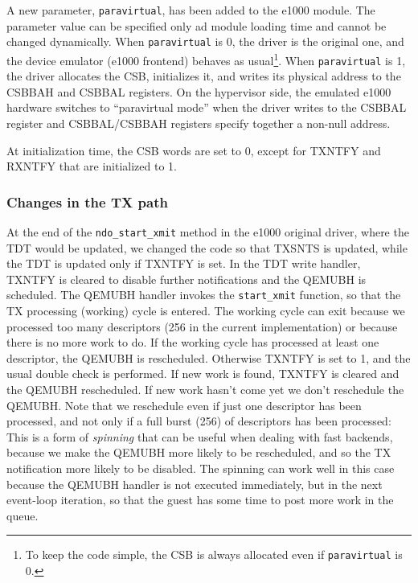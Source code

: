 \vspace{0.5cm}

A new parameter, \texttt{paravirtual}, has been added to the e1000 module. The parameter value can be specified only ad module loading time
and cannot be changed dynamically. When \texttt{paravirtual} is 0, the driver is the original one, and the device emulator (e1000 frontend)
behaves as usual\footnote{To keep the code simple, the CSB is always allocated even if \texttt{paravirtual} is 0.}. When 
\texttt{paravirtual} is 1, the driver allocates the CSB, initializes it, and writes its physical address to the CSBBAH and CSBBAL registers.
On the hypervisor side, the emulated e1000 hardware switches to ``paravirtual mode'' when the driver writes to the CSBBAL register and
CSBBAL/CSBBAH registers specify together a non-null address.

\vspace{0.5cm}

At initialization time, the CSB words are set to 0, except for TXNTFY and RXNTFY that are initialized to 1.


\subsubsection{Changes in the TX path}
At the end of the \texttt{ndo\_start\_xmit} method in the e1000 original driver, where the TDT would be updated, we changed the
code so that TXSNTS is updated, while the TDT is updated only if TXNTFY is set.
In the TDT write handler, TXNTFY is cleared to disable further notifications and the QEMUBH is scheduled. The QEMUBH handler invokes the
\texttt{start\_xmit} function, so that the TX processing (working) cycle is entered. The working cycle can exit because we processed
too many descriptors (256 in the current implementation) or because there is no more work to do. If the working cycle has processed at least
one descriptor, the QEMUBH is rescheduled. Otherwise TXNTFY is set to 1, and the usual double check is performed. If new work is found,
TXNTFY is cleared and the QEMUBH rescheduled. If new work hasn't come yet we don't reschedule the QEMUBH.
Note that we reschedule even if just one descriptor has been processed, and not only if a full burst (256) of descriptors has been processed:
This is a form of \emph{spinning} that can be useful when dealing with fast backends, because we make the QEMUBH more likely to be
rescheduled, and so the TX notification more likely to be disabled. The spinning can work well in this case because the QEMUBH handler is
not executed immediately, but in the next event-loop iteration, so that the guest has some time to post more work in the queue.


